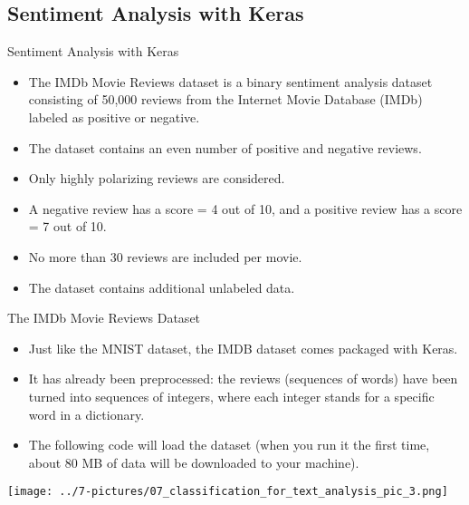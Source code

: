 \documentclass[11pt]{beamer}
\begin{document}
\subsection{Sentiment Analysis with Keras \\ }
\begin{frame}{Sentiment Analysis with Keras}
	\begin{itemize}
		\item The IMDb Movie Reviews dataset is a binary sentiment analysis dataset consisting of 50,000 reviews from the Internet Movie Database (IMDb) labeled as positive or negative. 
		\item The dataset contains an even number of positive and negative reviews. 
		\item Only highly polarizing reviews are considered. 
		\item A negative review has a score = 4 out of 10, and a positive review has a score = 7 out of 10. 
		\item No more than 30 reviews are included per movie. 
		\item The dataset contains additional unlabeled data.
	\end{itemize}
\end{frame}
\begin{frame}{The IMDb Movie Reviews Dataset}
	\begin{itemize}
		\item Just like the MNIST dataset, the IMDB dataset comes packaged with Keras. 
		\item It has already been preprocessed: the reviews (sequences of words) have been turned into sequences of integers, where each integer stands for a specific word in a dictionary.
		\item The following code will load the dataset (when you run it the first time, about 80 MB of data will be downloaded to your machine).
	\end{itemize}
	\begin{center}
	\texttt{[image: ../7-pictures/07\_classification\_for\_text\_analysis\_pic\_3.png]}
	\end{center}
\end{frame}
\end{document}
